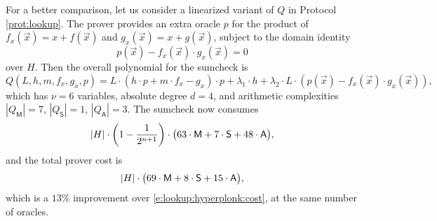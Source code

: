 \documentclass[11pt]{article}
\theoremstyle{definition}
\theoremstyle{remark}
\begin{document}
For a better comparison, let us consider a linearized variant of $Q$ in Protocol \ref{prot:lookup}.
The prover provides an extra oracle $p$ for the product of $f_x(\vec x) = x + f(\vec x)$ and $g_x(\vec x) = x + g(\vec x)$, subject to the domain identity
\[
p(\vec x) - f_x(\vec x)\cdot g_x(\vec x) = 0
\]
over $H$.
Then the overall polynomial for the sumcheck is 
\begin{equation*}
Q(L,h,m, f_x, g_x, p) =   
L\cdot  \left(h \cdot p + m\cdot f_x-  g_x\right)\cdot  p +  \lambda_1 \cdot h + \lambda_2\cdot L \cdot (p(\vec x) - f_x(\vec x)\cdot g_x(\vec x)),
\end{equation*}
which has $\nu=6$ variables,  absolute degree $d=4$, and arithmetic complexities $|Q_\mathsf M| = 7$, $|Q_\mathsf S| = 1$, $|Q_\mathsf A| = 3$.
The sumcheck now consumes
\begin{equation*}
|H| \cdot \left(1-\frac{1}{2^{n+1}}\right)\cdot \big(63 \cdot\textsf M +  7\cdot\textsf S + 48 \cdot \textsf A\big),
\end{equation*}
and the total prover cost is
\begin{equation*}
|H| \cdot \big(69 \cdot\textsf M +  8\cdot\textsf S + 15 \cdot \textsf A\big),
\end{equation*}
which is a $13\%$ improvement over \eqref{e:lookup:hyperplonk:cost}, at the same number of oracles.
\end{document}
